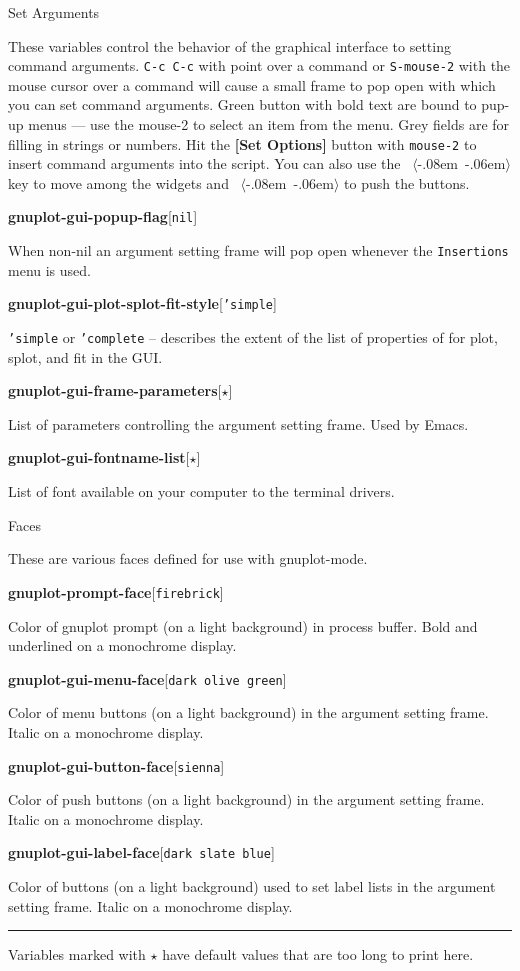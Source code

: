 \documentclass[twocolumn]{article}
\newenvironment{Boxedminipage}%
{\begin{Sbox}\begin{minipage}}%
  {\end{minipage}\end{Sbox}\Ovalbox{\TheSbox}}
\def\key#1{{\textrm \leavevmode\hbox{%
  \raise0.4pt\hbox{$\langle$}\kern-.08em\vtop{%
    \vbox{\hrule\kern-0.4pt
     \hbox{\raise0.4pt\hbox{\vphantom{$\langle$}}#1}}%
    \kern-0.4pt\hrule}%
  \kern-.06em\raise0.4pt\hbox{$\rangle$}}}}
\def\variable#1#2#3{{
    \vspace{-0.2truecm}
    \begin{flushright}
      \begin{minipage}[h]{0.97\linewidth}
        \vspace{-0.2truecm}
        \textbf{#1}\hfill[\texttt{#2}]
        \begin{flushright}
          \begin{minipage}[h]{0.93\linewidth}
            \vspace{-0.2truecm}
            #3
          \end{minipage}
        \end{flushright}
      \end{minipage}
    \end{flushright}
    }}
\def\Star{{$\star$}}
\begin{document}
\begin{center}
  \begin{Boxedminipage}{0.75\linewidth}
    \begin{center}
      {\large Set Arguments}
    \end{center}
  \end{Boxedminipage}
\end{center}

\noindent These variables control the behavior of the graphical
interface to setting command arguments.  \texttt{C-c C-c} with point
over a command or \texttt{S-mouse-2} with the mouse cursor over a
command will cause a small frame to pop open with which you can set
command arguments.  Green button with bold text are bound to pup-up
menus --- use the mouse-2 to select an item from the menu.  Grey fields
are for filling in strings or numbers.  Hit the \textbf{[Set Options]}
button with \texttt{mouse-2} to insert command arguments into the
script.  You can also use the \key{tab} key to move among the widgets
and \key{ret} to push the buttons.

\vspace{2ex}
%
\variable{gnuplot-gui-popup-flag}{nil}{When non-nil an argument
setting frame will pop open whenever the \texttt{Insertions} menu is
used.}
%
\variable{gnuplot-gui-plot-splot-fit-style}{'simple}{\texttt{'simple}
  or \texttt{'complete} -- describes the extent of the list of
  properties of for plot, splot, and fit in the GUI.}
%
\variable{gnuplot-gui-frame-parameters}{\Star}{List of parameters
  controlling the argument setting frame.  Used by Emacs.}
%
\variable{gnuplot-gui-fontname-list}{\Star}{List of font available on your
  computer to the terminal drivers.}
%

\vfill\eject

\begin{center}
  \begin{Boxedminipage}{0.75\linewidth}
    \begin{center}
      {\large Faces}
    \end{center}
  \end{Boxedminipage}
\end{center}

\noindent These are various faces defined for use with gnuplot-mode.
\vspace{2ex}

%
\variable{gnuplot-prompt-face}{firebrick}{Color of gnuplot prompt (on a
  light background) in process buffer.  Bold and underlined on a
  monochrome display.}
%
\variable{gnuplot-gui-menu-face}{dark olive green}{Color of menu
  buttons (on a light background) in the argument setting frame.
  Italic on a monochrome display.}
%
\variable{gnuplot-gui-button-face}{sienna}{Color of push buttons (on a
  light background) in the argument setting frame.  Italic on a
  monochrome display.}
%
\variable{gnuplot-gui-label-face}{dark slate blue}{Color of buttons (on
  a light background) used to set label lists in the argument setting
  frame.  Italic on a monochrome display.}
%

\vfill
\hrule
\vspace{0.5ex}
\begin{flushleft}
  \footnotesize{Variables marked with {\Star} have default values that
    are too long to print here.}
\end{flushleft}
\end{document}

